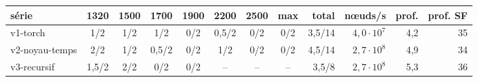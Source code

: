 \begin{tabular}{lcccccccrrrr}
\toprule
série & 1320 & 1500 & 1700 & 1900 & 2200 & 2500 & max & total & nœuds/s & prof. & prof. SF\\
\midrule
v1-torch & 1/2 & 1/2 & 1/2 & 0/2 & 0{,}5/2 & 0/2 & 0/2 & 3{,}5/14 & $4{,}0\cdot 10^{7}$ & 4{,}2 & 35\\
v2-noyau-temps & 2/2 & 1/2 & 0{,}5/2 & 0/2 & 1/2 & 0/2 & 0/2 & 4{,}5/14 & $2{,}7\cdot 10^{8}$ & 4{,}9 & 34\\
v3-recursif & 1{,}5/2 & 2/2 & 0/2 & 0/2 & -- & -- & -- & 3{,}5/8 & $2{,}7\cdot 10^{8}$ & 5{,}3 & 36\\
\bottomrule
\end{tabular}
